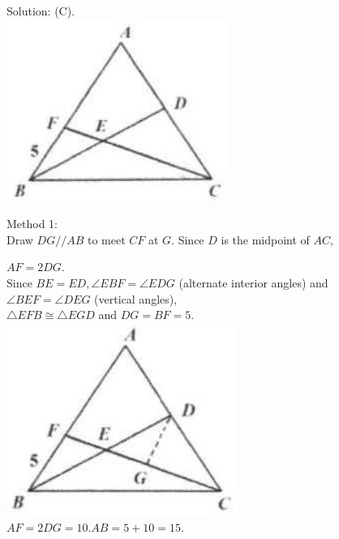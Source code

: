 \documentclass[10pt]{article}
\begin{document}
Solution: (C).\\
\includegraphics[max width=\textwidth, center]{2025_04_17_97bc1f7e44d93c271a88g-102(4)}

Method 1:\\
Draw \(D G / / A B\) to meet \(C F\) at \(G\). Since \(D\) is the midpoint of \(A C\),


\(A F=2 D G\).\\
Since \(B E=E D, \angle E B F=\angle E D G\) (alternate interior angles) and \(\angle B E F=\angle D E G\) (vertical angles),\\
\(\triangle E F B \cong \triangle E G D\) and \(D G=B F=5\).\\
\includegraphics[max width=\textwidth, center]{2025_04_17_97bc1f7e44d93c271a88g-103(1)}\\
\(A F=2 D G=10 . A B=5+10=15\).
\end{document}
